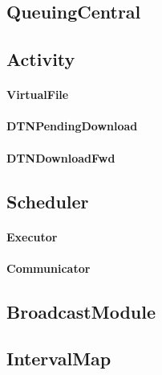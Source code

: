 \subsection{QueuingCentral}

\subsection{Activity}
\paragraph{VirtualFile}
\paragraph{DTNPendingDownload}
\paragraph{DTNDownloadFwd}

\subsection{Scheduler}
\paragraph{Executor}
\paragraph{Communicator}

\subsection{BroadcastModule}

\subsection{IntervalMap}
 

